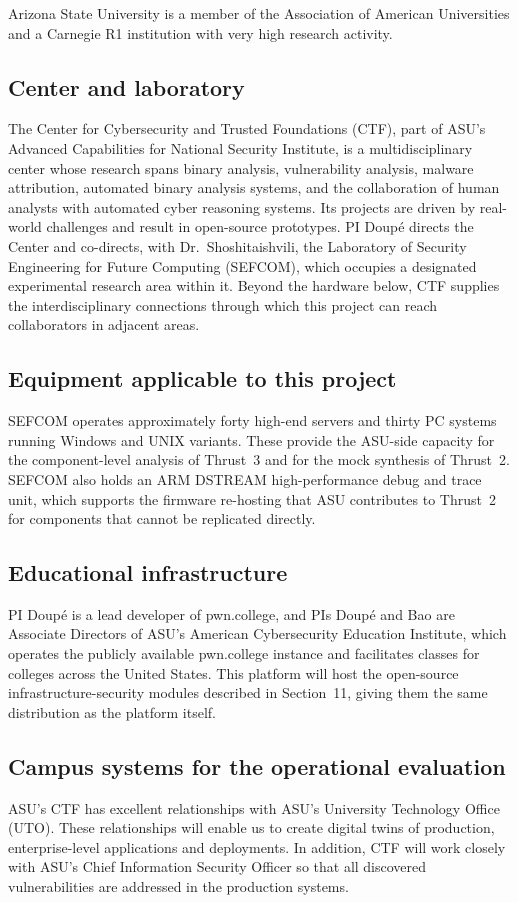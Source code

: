 \documentclass[11pt,letterpaper]{article}
\begin{document}
Arizona State University is a member of the Association of American
Universities and a Carnegie R1 institution with very high research activity.

\subsection{Center and laboratory}
The Center for Cybersecurity and Trusted Foundations (CTF), part of ASU's
Advanced Capabilities for National Security Institute, is a multidisciplinary
center whose research spans binary analysis, vulnerability analysis, malware
attribution, automated binary analysis systems, and the collaboration of human
analysts with automated cyber reasoning systems. Its projects are driven by
real-world challenges and result in open-source prototypes. PI Doup\'e directs
the Center and co-directs, with Dr.~Shoshitaishvili, the Laboratory of
Security Engineering for Future Computing (SEFCOM), which occupies a
designated experimental research area within it. Beyond the hardware below,
CTF supplies the interdisciplinary connections through which this project can
reach collaborators in adjacent areas.

\subsection{Equipment applicable to this project}
SEFCOM operates approximately forty high-end servers and thirty PC systems
running Windows and UNIX variants. These provide the ASU-side capacity for the
component-level analysis of Thrust~3 and for the mock synthesis of Thrust~2.
SEFCOM also holds an ARM DSTREAM high-performance debug and trace unit, which
supports the firmware re-hosting that ASU contributes to Thrust~2 for
components that cannot be replicated directly.

\subsection{Educational infrastructure}
PI Doup\'e is a lead developer of pwn.college, and PIs Doup\'e and Bao are
Associate Directors of ASU's American Cybersecurity Education Institute, which
operates the publicly available pwn.college instance and facilitates classes
for colleges across the United States. This platform will host the open-source
infrastructure-security modules described in Section~11, giving them the same
distribution as the platform itself.

\subsection{Campus systems for the operational evaluation}
ASU's CTF has excellent relationships with ASU's University Technology Office (UTO).
These relationships will enable us to create digital twins of production, enterprise-level applications and deployments.
In addition, CTF will work closely with ASU's Chief Information Security Officer so that all discovered vulnerabilities are addressed in the production systems. 
\end{document}
